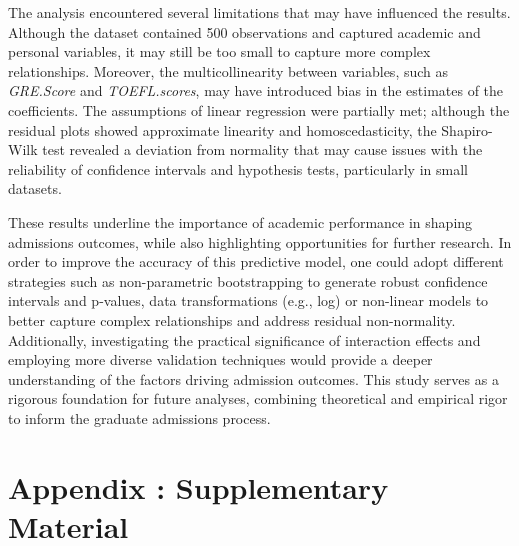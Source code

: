 \documentclass[12pt]{article}
\begin{document}
\vspace{10pt}
\indent The analysis encountered several limitations that may have influenced the results. Although the dataset contained 500 observations and captured academic and personal variables, it may still be too small to capture more complex relationships. Moreover, the multicollinearity between variables, such as \textit{GRE.Score} and \textit{TOEFL.scores}, may have introduced bias in the estimates of the coefficients. The assumptions of linear regression were partially met; although the residual plots showed approximate linearity and homoscedasticity, the Shapiro-Wilk test revealed a deviation from normality that may cause issues with the reliability of confidence intervals and hypothesis tests, particularly in small datasets.

\vspace{10pt}
\indent These results underline the importance of academic performance in shaping admissions outcomes, while also highlighting opportunities for further research. In order to improve the accuracy of this predictive model, one could adopt different strategies such as non-parametric bootstrapping to generate robust confidence intervals and p-values, data transformations (e.g., log) or non-linear models to better capture complex relationships and address residual non-normality. Additionally, investigating the practical significance of interaction effects and employing more diverse validation techniques would provide a deeper understanding of the factors driving admission outcomes. This study serves as a rigorous foundation for future analyses, combining theoretical and empirical rigor to inform the graduate admissions process.


\newpage
\appendix

\section{Appendix : Supplementary Material}
\vspace{1cm}
\end{document}
